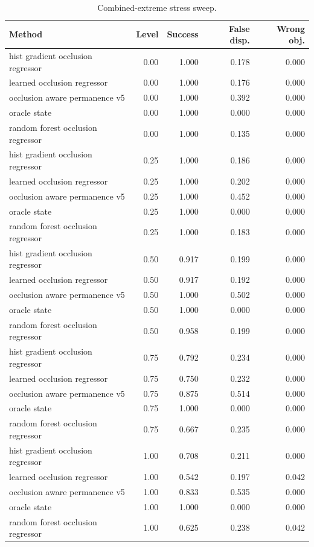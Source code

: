 \begin{table}[t]
\centering
\caption{Combined-extreme stress sweep.}
\label{tab:stress}
\small
\begin{tabular}{lrrrr}
\toprule
Method & Level & Success & False disp. & Wrong obj. \\
\midrule
hist gradient occlusion regressor & 0.00 & 1.000 & 0.178 & 0.000 \\
learned occlusion regressor & 0.00 & 1.000 & 0.176 & 0.000 \\
occlusion aware permanence v5 & 0.00 & 1.000 & 0.392 & 0.000 \\
oracle state & 0.00 & 1.000 & 0.000 & 0.000 \\
random forest occlusion regressor & 0.00 & 1.000 & 0.135 & 0.000 \\
hist gradient occlusion regressor & 0.25 & 1.000 & 0.186 & 0.000 \\
learned occlusion regressor & 0.25 & 1.000 & 0.202 & 0.000 \\
occlusion aware permanence v5 & 0.25 & 1.000 & 0.452 & 0.000 \\
oracle state & 0.25 & 1.000 & 0.000 & 0.000 \\
random forest occlusion regressor & 0.25 & 1.000 & 0.183 & 0.000 \\
hist gradient occlusion regressor & 0.50 & 0.917 & 0.199 & 0.000 \\
learned occlusion regressor & 0.50 & 0.917 & 0.192 & 0.000 \\
occlusion aware permanence v5 & 0.50 & 1.000 & 0.502 & 0.000 \\
oracle state & 0.50 & 1.000 & 0.000 & 0.000 \\
random forest occlusion regressor & 0.50 & 0.958 & 0.199 & 0.000 \\
hist gradient occlusion regressor & 0.75 & 0.792 & 0.234 & 0.000 \\
learned occlusion regressor & 0.75 & 0.750 & 0.232 & 0.000 \\
occlusion aware permanence v5 & 0.75 & 0.875 & 0.514 & 0.000 \\
oracle state & 0.75 & 1.000 & 0.000 & 0.000 \\
random forest occlusion regressor & 0.75 & 0.667 & 0.235 & 0.000 \\
hist gradient occlusion regressor & 1.00 & 0.708 & 0.211 & 0.000 \\
learned occlusion regressor & 1.00 & 0.542 & 0.197 & 0.042 \\
occlusion aware permanence v5 & 1.00 & 0.833 & 0.535 & 0.000 \\
oracle state & 1.00 & 1.000 & 0.000 & 0.000 \\
random forest occlusion regressor & 1.00 & 0.625 & 0.238 & 0.042 \\
\bottomrule
\end{tabular}
\end{table}

